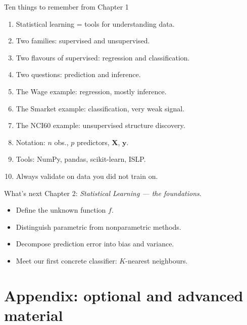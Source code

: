 \documentclass[aspectratio=169,11pt]{beamer}
\begin{document}
\begin{frame}{Ten things to remember from Chapter 1}
  \begin{enumerate}
    \item Statistical learning = tools for understanding data.
    \item Two families: supervised and unsupervised.
    \item Two flavours of supervised: regression and classification.
    \item Two questions: prediction and inference.
    \item The Wage example: regression, mostly inference.
    \item The Smarket example: classification, very weak signal.
    \item The NCI60 example: unsupervised structure discovery.
    \item Notation: $n$ obs., $p$ predictors, $\mathbf{X}$,
          $\mathbf{y}$.
    \item Tools: NumPy, pandas, scikit-learn, ISLP.
    \item Always validate on data you did not train on.
  \end{enumerate}
\end{frame}

\begin{frame}{What's next}
  Chapter 2: \emph{Statistical Learning --- the foundations}.
  \begin{itemize}
    \item Define the unknown function $f$.
    \item Distinguish parametric from nonparametric methods.
    \item Decompose prediction error into bias and variance.
    \item Meet our first concrete classifier: $K$-nearest neighbours.
  \end{itemize}
\end{frame}


\appendix
\AtBeginSection[]{}
\section{Appendix: optional and advanced material}
\end{document}
